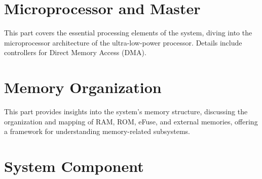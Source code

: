 \documentclass[openany, 10pt]{book}
\begin{document}
\setenglishformatting




\clearpage

\clearpage


\tableofcontents
\clearpage
\listoftables
\clearpage
\listoffigures





\part{Microprocessor and Master}


This part covers the essential processing elements of the system, diving into the microprocessor architecture of the ultra-low-power processor. Details include controllers for Direct Memory Access (DMA).



\part{Memory Organization}

This part provides insights into the system's memory structure, discussing the organization and mapping of RAM, ROM, eFuse, and external memories, offering a framework for understanding memory-related subsystems.


\part{System Component}
\end{document}
